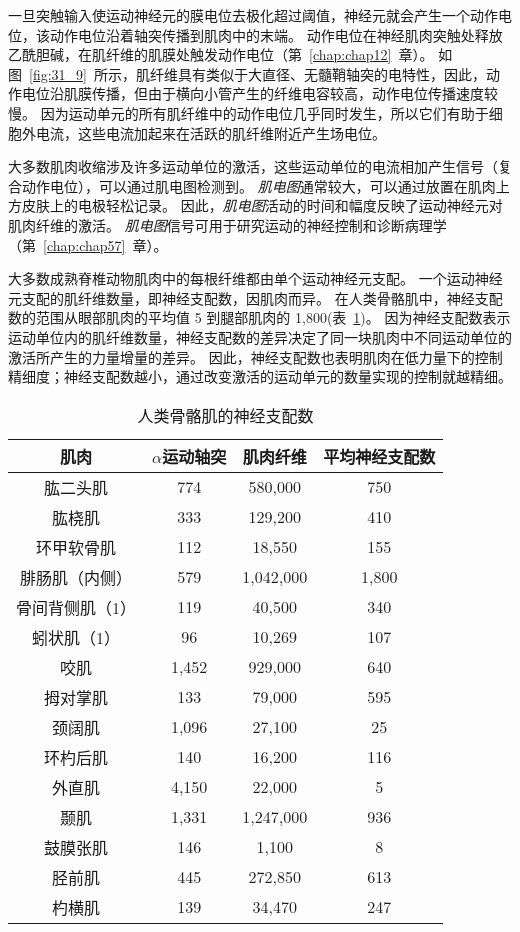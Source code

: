 一旦突触输入使运动神经元的膜电位去极化超过阈值，神经元就会产生一个动作电位，该动作电位沿着轴突传播到肌肉中的末端。
动作电位在神经肌肉突触处释放乙酰胆碱，在肌纤维的肌膜处触发动作电位（第~\ref{chap:chap12}~章）。
如图~\ref{fig:31_9}~所示，肌纤维具有类似于大直径、无髓鞘轴突的电特性，因此，动作电位沿肌膜传播，但由于横向小管产生的纤维电容较高，动作电位传播速度较慢。
因为运动单元的所有肌纤维中的动作电位几乎同时发生，所以它们有助于细胞外电流，这些电流加起来在活跃的肌纤维附近产生场电位。


大多数肌肉收缩涉及许多运动单位的激活，这些运动单位的电流相加产生信号（复合动作电位），可以通过肌电图检测到。
\textit{肌电图}通常较大，可以通过放置在肌肉上方皮肤上的电极轻松记录。
因此，\textit{肌电图}活动的时间和幅度反映了运动神经元对肌肉纤维的激活。
\textit{肌电图}信号可用于研究运动的神经控制和诊断病理学（第~\ref{chap:chap57}~章）。


大多数成熟脊椎动物肌肉中的每根纤维都由单个运动神经元支配。
一个运动神经元支配的肌纤维数量，即神经支配数，因肌肉而异。
在人类骨骼肌中，神经支配数的范围从眼部肌肉的平均值 5 到腿部肌肉的 1,800(表~\ref{tab:31_1})。
因为神经支配数表示运动单位内的肌纤维数量，神经支配数的差异决定了同一块肌肉中不同运动单位的激活所产生的力量增量的差异。
因此，神经支配数也表明肌肉在低力量下的控制精细度；神经支配数越小，通过改变激活的运动单元的数量实现的控制就越精细。


\begin{table}[htbp]
	\caption{人类骨骼肌的神经支配数\label{tab:31_1}}
	\centering
	\begin{tabular}{cccc}
		\toprule
		肌肉 & $ \alpha $运动轴突 & 肌肉纤维 & 平均神经支配数\\
		\midrule
		肱二头肌 & 774  & 580,000 & 750 \\
		肱桡肌 & 333  & 129,200 & 410 \\
		环甲软骨肌 & 112  & 18,550 & 155 \\
		腓肠肌（内侧） & 579  & 1,042,000 & 1,800 \\
		骨间背侧肌（1） & 119  & 40,500 & 340 \\
		蚓状肌（1） & 96  & 10,269 & 107 \\
		咬肌 & 1,452  & 929,000 & 640 \\
		拇对掌肌 & 133  & 79,000 & 595 \\
		颈阔肌 & 1,096  & 27,100 & 25 \\
		环杓后肌 & 140  & 16,200 & 116 \\
		外直肌 & 4,150  & 22,000 & 5 \\
		颞肌 & 1,331  & 1,247,000 & 936 \\
		鼓膜张肌 & 146  & 1,100 & 8 \\
		胫前肌 & 445  & 272,850 & 613 \\
		杓横肌 & 139  & 34,470 & 247 \\
		\bottomrule
	\end{tabular}
\end{table}


